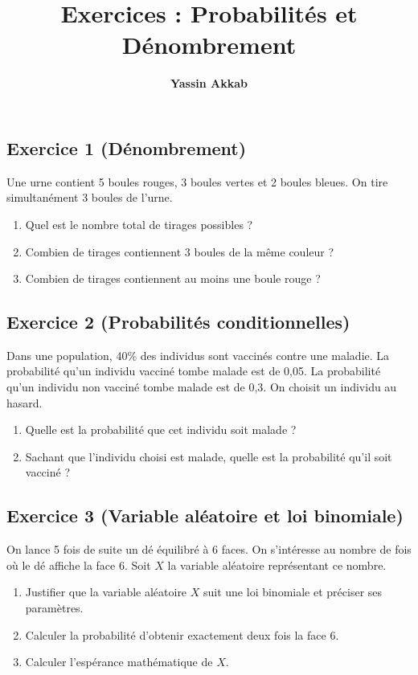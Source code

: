 \documentclass{article}
\title{\textbf{Exercices : Probabilités et Dénombrement}}
\author{\textbf{Yassin Akkab}}
\begin{document}
	
	\maketitle
	
	\subsection*{Exercice 1 (Dénombrement)}
	Une urne contient 5 boules rouges, 3 boules vertes et 2 boules bleues. On tire simultanément 3 boules de l'urne.
	\begin{enumerate}
		\item Quel est le nombre total de tirages possibles ?
		\item Combien de tirages contiennent 3 boules de la même couleur ?
		\item Combien de tirages contiennent au moins une boule rouge ?
	\end{enumerate}
	
	\subsection*{Exercice 2 (Probabilités conditionnelles)}
	Dans une population, 40\% des individus sont vaccinés contre une maladie. La probabilité qu'un individu vacciné tombe malade est de 0,05. La probabilité qu'un individu non vacciné tombe malade est de 0,3.
	On choisit un individu au hasard.
	\begin{enumerate}
		\item Quelle est la probabilité que cet individu soit malade ?
		\item Sachant que l'individu choisi est malade, quelle est la probabilité qu'il soit vacciné ?
	\end{enumerate}
	
	\subsection*{Exercice 3 (Variable aléatoire et loi binomiale)}
	On lance 5 fois de suite un dé équilibré à 6 faces. On s'intéresse au nombre de fois où le dé affiche la face 6.
	Soit $X$ la variable aléatoire représentant ce nombre.
	\begin{enumerate}
		\item Justifier que la variable aléatoire $X$ suit une loi binomiale et préciser ses paramètres.
		\item Calculer la probabilité d'obtenir exactement deux fois la face 6.
		\item Calculer l'espérance mathématique de $X$.
	\end{enumerate}
	
\end{document}
